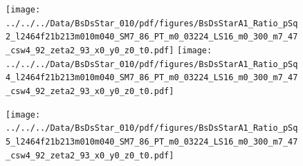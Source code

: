 \documentclass[a4paper,10pt]{article}
\begin{document}
\clearpage
\begin{figure}[p]
 \texttt{[image: ../../../Data/BsDsStar\_010/pdf/figures/BsDsStarA1\_Ratio\_pSq2\_l2464f21b213m010m040\_SM7\_86\_PT\_m0\_03224\_LS16\_m0\_300\_m7\_47\_csw4\_92\_zeta2\_93\_x0\_y0\_z0\_t0.pdf]} 
 \texttt{[image: ../../../Data/BsDsStar\_010/pdf/figures/BsDsStarA1\_Ratio\_pSq4\_l2464f21b213m010m040\_SM7\_86\_PT\_m0\_03224\_LS16\_m0\_300\_m7\_47\_csw4\_92\_zeta2\_93\_x0\_y0\_z0\_t0.pdf]} 
 \end{figure}
\begin{figure}[p]
 \texttt{[image: ../../../Data/BsDsStar\_010/pdf/figures/BsDsStarA1\_Ratio\_pSq5\_l2464f21b213m010m040\_SM7\_86\_PT\_m0\_03224\_LS16\_m0\_300\_m7\_47\_csw4\_92\_zeta2\_93\_x0\_y0\_z0\_t0.pdf]} 
 \end{figure}
\clearpage
\end{document}
